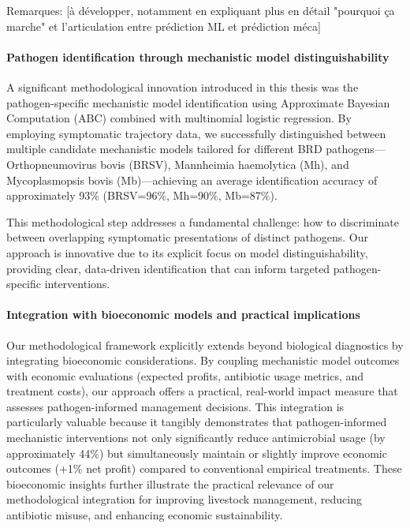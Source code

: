 Remarques: [à développer, notamment en expliquant plus en détail "pourquoi ça marche" et l'articulation entre prédiction ML et prédiction méca]

\paragraph{Pathogen identification through mechanistic model distinguishability} A significant methodological innovation introduced in this thesis was the pathogen-specific mechanistic model identification using Approximate Bayesian Computation (ABC) combined with multinomial logistic regression. By employing symptomatic trajectory data, we successfully distinguished between multiple candidate mechanistic models tailored for different BRD pathogens—Orthopneumovirus bovis (BRSV), Mannheimia haemolytica (Mh), and Mycoplasmopsis bovis (Mb)—achieving an average identification accuracy of approximately 93\% (BRSV=96\%, Mh=90\%, Mb=87\%).

This methodological step addresses a fundamental challenge: how to discriminate between overlapping symptomatic presentations of distinct pathogens. Our approach is innovative due to its explicit focus on model distinguishability, providing clear, data-driven identification that can inform targeted pathogen-specific interventions.

\paragraph{Integration with bioeconomic models and practical implications} Our methodological framework explicitly extends beyond biological diagnostics by integrating bioeconomic considerations. By coupling mechanistic model outcomes with economic evaluations (expected profits, antibiotic usage metrics, and treatment costs), our approach offers a practical, real-world impact measure that assesses pathogen-informed management decisions.
This integration is particularly valuable because it tangibly demonstrates that pathogen-informed mechanistic interventions not only significantly reduce antimicrobial usage (by approximately 44\%) but simultaneously maintain or slightly improve economic outcomes (+1\% net profit) compared to conventional empirical treatments. These bioeconomic insights further illustrate the practical relevance of our methodological integration for improving livestock management, reducing antibiotic misuse, and enhancing economic sustainability.

